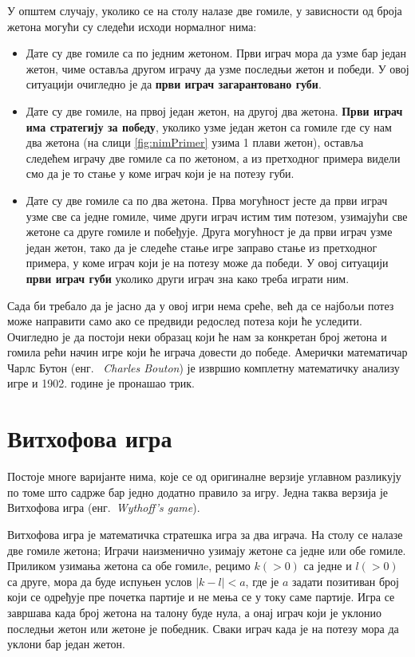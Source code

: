 \documentclass[a4paper]{article}
\begin{document}
У општем случају, уколико се на столу налазе две гомиле, у зависности од броја жетона могући су следећи исходи нормалног нима:

\begin{itemize}
	\item Дате су две гомиле са по једним жетоном. Први играч мора да узме бар један жетон, чиме оставља другом играчу да узме последњи жетон и победи. У овој ситуацији очигледно је да \textbf{први играч загарантовано губи}.
	
	\item Дате су две гомиле, на првој један жетон, на другој два жетона. \textbf{Први играч има стратегију за победу}, уколико узме један жетон са гомиле где су нам два жетона (на слици \ref{fig:nimPrimer} узима 1 плави жетон), оставља следећем играчу две гомиле са по жетоном, а из претходног примера видели смо да је то стање у коме играч који је на потезу губи.
	
	\item Дате су две гомиле са по два жетона. Прва могућност јесте да први играч узме све са једне гомиле, чиме други играч истим тим потезом, узимајући све жетоне са друге гомиле и побеђује. Друга могућност је да први играч узме један жетон, тако да је следеће стање игре заправо стање из претходног примера, у коме играч који је на потезу може да победи. У овој ситуацији \textbf{први играч губи} уколико други играч зна како треба играти ним.
\end{itemize}

Сада би требало да је јасно да у овој игри нема среће, већ да се најбољи потез може направити само ако се предвиди редослед потеза који ће уследити. Очигледно је да постоји неки образац који ће нам за конкретан број жетона и гомила рећи начин игре који ће играча довести до победе. Амерички математичар Чарлс Бутон (енг. {~\em Charles Bouton}) је извршио комплетну математичку анализу игре и 1902. године је пронашао трик. \cite{10.2307/1967631}

\section{Витхофова игра}
\label{sec:vithofova_igra}

Постоје многе варијанте нима, које се од оригиналне верзије углавном разликују по томе што садрже бар једно додатно правило за игру. Једна таква верзија је Витхофова игра (енг.{~\em Wythoff's game})\cite{10.2307/2321643}.

Витхофова игра је математичка стратешка игра за два играча. На столу се налазе две гомиле жетона; Играчи наизменично узимају жетоне са једне или обе гомиле. Приликом узимања жетона са обе гомилe, рецимо $ k (> 0) $ са једне и $ l (> 0) $ са друге, мора да буде испуњен услов $ |k - l| < a $, где је $ a $ задати позитиван број који се одређује пре почетка партије и не мења се у току саме партије. Игра се завршава када број жетона на талону буде нула, а онај играч који је уклонио последњи жетон или жетоне је победник. Сваки играч када је на потезу мора да уклони бар један жетон.
\end{document}
